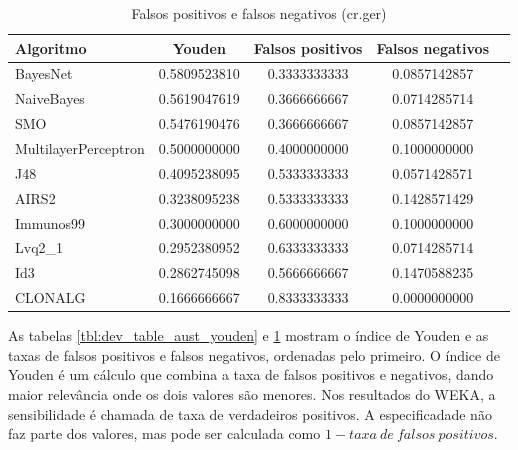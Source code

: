 \begin{table}[h]
    \centering
    \caption{Falsos positivos e falsos negativos (cr.ger)}
    \label{tbl:dev_table_ger_youden}
    \vspace{0.5cm}
    \begin{tabular}{|l|c|c|c|c|}
        \hline
        \textbf{Algoritmo} & \textbf{Youden} & \textbf{Falsos positivos} & \textbf{Falsos negativos} \\
        \hline
        \rowcolor[gray]{.9}
        BayesNet             & 0.5809523810 & 0.3333333333 & 0.0857142857 \\ \hline
        \rowcolor[gray]{.9}
        NaiveBayes           & 0.5619047619 & 0.3666666667 & 0.0714285714 \\ \hline
        \rowcolor[gray]{.9}
        SMO                  & 0.5476190476 & 0.3666666667 & 0.0857142857 \\ \hline
        MultilayerPerceptron & 0.5000000000 & 0.4000000000 & 0.1000000000 \\ \hline
        J48                  & 0.4095238095 & 0.5333333333 & 0.0571428571 \\ \hline
        AIRS2                & 0.3238095238 & 0.5333333333 & 0.1428571429 \\ \hline
        Immunos99            & 0.3000000000 & 0.6000000000 & 0.1000000000 \\ \hline
        Lvq2\_1              & 0.2952380952 & 0.6333333333 & 0.0714285714 \\ \hline
        Id3                  & 0.2862745098 & 0.5666666667 & 0.1470588235 \\ \hline
        CLONALG              & 0.1666666667 & 0.8333333333 & 0.0000000000 \\ \hline
    \end{tabular}
\end{table}

As tabelas \ref{tbl:dev_table_aust_youden} e \ref{tbl:dev_table_ger_youden} mostram o índice de Youden e as taxas de falsos positivos e falsos negativos, ordenadas pelo primeiro. O índice de Youden é um cálculo que combina a taxa de falsos positivos e negativos, dando maior relevância onde os dois valores são menores. Nos resultados do WEKA, a sensibilidade é chamada de taxa de verdadeiros positivos. A especificadade não faz parte dos valores, mas pode ser calculada como $1 - taxa\ de\ falsos\ positivos$.

